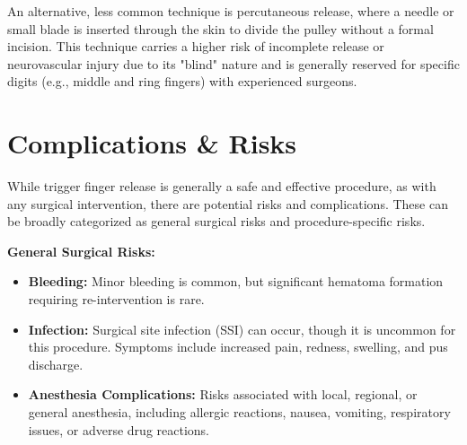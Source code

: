 An alternative, less common technique is percutaneous release, where a needle or small blade is inserted through the skin to divide the pulley without a formal incision. This technique carries a higher risk of incomplete release or neurovascular injury due to its "blind" nature and is generally reserved for specific digits (e.g., middle and ring fingers) with experienced surgeons.

\section*{Complications \& Risks}
While trigger finger release is generally a safe and effective procedure, as with any surgical intervention, there are potential risks and complications. These can be broadly categorized as general surgical risks and procedure-specific risks.

\textbf{General Surgical Risks:}
\begin{itemize}
  \item \textbf{Bleeding:} Minor bleeding is common, but significant hematoma formation requiring re-intervention is rare.
  
  \item \textbf{Infection:} Surgical site infection (SSI) can occur, though it is uncommon for this procedure. Symptoms include increased pain, redness, swelling, and pus discharge.
  
  \item \textbf{Anesthesia Complications:} Risks associated with local, regional, or general anesthesia, including allergic reactions, nausea, vomiting, respiratory issues, or adverse drug reactions.
\end{itemize}

